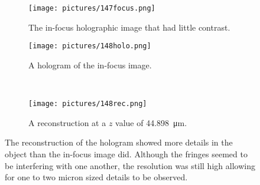 \begin{figure}[ht!]
    \begin{center}

        \begin{subfigure}[t]{0.4\textwidth}
            \label{fig:147focus}
            \texttt{[image: pictures/147focus.png]}
            \caption{The in-focus holographic image that had little contrast.}
        \end{subfigure}
        \hspace*{\fill}
        \begin{subfigure}[t]{0.4\textwidth}
            \label{fig:148holo}
            \texttt{[image: pictures/148holo.png]}
            \caption{A hologram of the in-focus image.}
        \end{subfigure}
        \\
        \begin{subfigure}[t]{\textwidth}
            \label{fig:148rec}
            \texttt{[image: pictures/148rec.png]}
            \caption{A reconstruction at a $z$ value of
                \SI{44.898}{\micro\meter}.}
        \end{subfigure}


    \end{center}
    \caption{%
        The reconstruction of the hologram showed more details in the object
        than the in-focus image did. Although the fringes seemed to be interfering with
        one another, the resolution was still high allowing for one to
        two micron sized details to be observed.
    }%
    \label{fig:148}
\end{figure}
\clearpage

